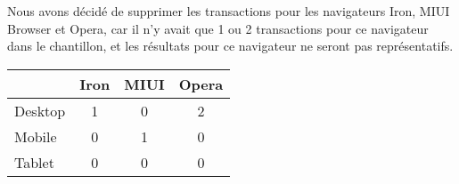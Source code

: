 Nous avons décidé de supprimer les transactions pour les navigateurs Iron, MIUI Browser et Opera, car il n'y avait que 1 ou 2 transactions pour ce navigateur dans le chantillon, et les résultats pour ce navigateur ne seront pas représentatifs.



\begin{table}[ht]
\begin{adjustbox}{width=0.4\textwidth}
\begin{tabular}{|l|c|c|c|}
\hline
        & \multicolumn{1}{l|}{Iron} & \multicolumn{1}{l|}{MIUI} & \multicolumn{1}{l|}{Opera} \\ \hline
Desktop & 1                         & 0                         & 2                          \\ \hline
Mobile  & 0                         & 1                         & 0                          \\ \hline
Tablet  & 0                         & 0                         & 0                          \\ \hline
\end{tabular}
\end{adjustbox}
\end{table}



